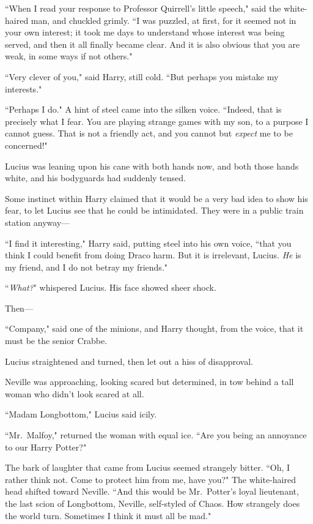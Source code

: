 ``When I read your response to Professor Quirrell's little speech," said the white-haired man, and chuckled grimly. ``I was puzzled, at first, for it seemed not in your own interest; it took me days to understand whose interest was being served, and then it all finally became clear. And it is also obvious that you are weak, in some ways if not others."

``Very clever of you," said Harry, still cold. ``But perhaps you mistake my interests."

``Perhaps I do." A hint of steel came into the silken voice. ``Indeed, that is precisely what I fear. You are playing strange games with my son, to a purpose I cannot guess. That is not a friendly act, and you cannot but \emph{expect} me to be concerned!"

Lucius was leaning upon his cane with both hands now, and both those hands white, and his bodyguards had suddenly tensed.

Some instinct within Harry claimed that it would be a very bad idea to show his fear, to let Lucius see that he could be intimidated. They were in a public train station anyway---

``I find it interesting," Harry said, putting steel into his own voice, ``that you think I could benefit from doing Draco harm. But it is irrelevant, Lucius. \emph{He} is my friend, and I do not betray my friends."

``\emph{What?}" whispered Lucius. His face showed sheer shock.

Then---

``Company," said one of the minions, and Harry thought, from the voice, that it must be the senior Crabbe.

Lucius straightened and turned, then let out a hiss of disapproval.

Neville was approaching, looking scared but determined, in tow behind a tall woman who didn't look scared at all.

``Madam Longbottom," Lucius said icily.

``Mr.~Malfoy," returned the woman with equal ice. ``Are you being an annoyance to our Harry Potter?"

The bark of laughter that came from Lucius seemed strangely bitter. ``Oh, I rather think not. Come to protect him from me, have you?" The white-haired head shifted toward Neville. ``And this would be Mr.~Potter's loyal lieutenant, the last scion of Longbottom, Neville, self-styled of Chaos. How strangely does the world turn. Sometimes I think it must all be mad."

